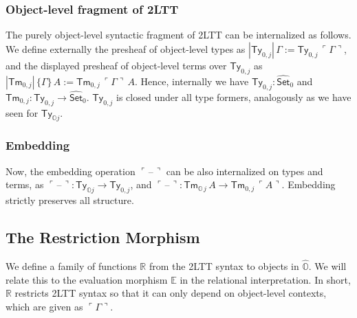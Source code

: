 \documentclass[acmsmall,review]{acmart}
\newcommand{\msf}[1]{\mathsf{#1}}
\newcommand{\mbb}[1]{\mathbb{#1}}
\newcommand{\wh}[1]{\widehat{#1}}
\newcommand{\mbbo}{\mbb{O}}
\newcommand{\Ty}{\msf{Ty}}
\newcommand{\Tm}{\msf{Tm}}
\newcommand{\Set}{\mathsf{Set}}
\newcommand{\blank}{{\mathord{\hspace{1pt}\text{--}\hspace{1pt}}}}
\newcommand{\emb}[1]{\ulcorner#1\urcorner}
\newcommand{\hato}{\bm\hat{\mbbo}}
\newcommand{\ev}{\mbb{E}}
\newcommand{\re}{\mbb{R}}
\theoremstyle{remark}
\newcommand{\whset}{\wh{\Set}}
\begin{document}
\subsubsection{Object-level fragment of 2LTT}
The purely object-level syntactic fragment of 2LTT can be internalized as
follows. We define externally the presheaf of object-level types as
$|\Ty_{0,j}|\,\Gamma := \Ty_{0,j}\,\emb{\Gamma}$, and the displayed presheaf of
object-level terms over $\Ty_{0,j}$ as $|\Tm_{0,j}|\,\{\Gamma\}\,A :=
\Tm_{0,j}\,\emb{\Gamma}\,A$. Hence, internally we have $\Ty_{0,j} : \whset_0$ and
$\Tm_{0,j} : \Ty_{0,j} \to \whset_0$. $\Ty_{0,j}$ is closed under all type formers,
analogously as we have seen for $\Ty_{\mbbo j}$.

\subsubsection{Embedding}
Now, the embedding operation $\emb{\blank}$ can be also internalized on types
and terms, as $\emb{\blank} : \Ty_{\mbbo j} \to \Ty_{0,j}$, and $\emb{\blank}
:\Tm_{\mbbo\,j}\,A \to \Tm_{0,j}\,\emb{A}$. Embedding strictly preserves all structure.

\subsection{The Restriction Morphism}

We define a family of functions $\re$ from the 2LTT syntax to objects in
$\hato$. We will relate this to the evaluation morphism $\ev$ in the relational
interpretation. In short, $\re$ restricts 2LTT syntax so that it can only depend
on object-level contexts, which are given as $\emb{\Gamma}$.
\end{document}
